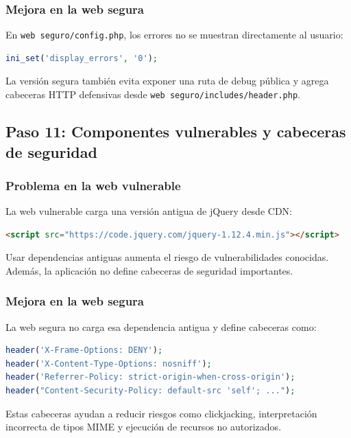 \documentclass[12pt,a4paper]{article}
\begin{document}
\subsubsection*{Mejora en la web segura}

En \texttt{web seguro/config.php}, los errores no se muestran directamente al usuario:

\begin{lstlisting}[language=PHP]
ini_set('display_errors', '0');
\end{lstlisting}

La versión segura también evita exponer una ruta de debug pública y agrega cabeceras HTTP defensivas desde \texttt{web seguro/includes/header.php}.

\subsection{Paso 11: Componentes vulnerables y cabeceras de seguridad}

\subsubsection*{Problema en la web vulnerable}

La web vulnerable carga una versión antigua de jQuery desde CDN:

\begin{lstlisting}[language=HTML]
<script src="https://code.jquery.com/jquery-1.12.4.min.js"></script>
\end{lstlisting}

Usar dependencias antiguas aumenta el riesgo de vulnerabilidades conocidas. Además, la aplicación no define cabeceras de seguridad importantes.

\subsubsection*{Mejora en la web segura}

La web segura no carga esa dependencia antigua y define cabeceras como:

\begin{lstlisting}[language=PHP]
header('X-Frame-Options: DENY');
header('X-Content-Type-Options: nosniff');
header('Referrer-Policy: strict-origin-when-cross-origin');
header("Content-Security-Policy: default-src 'self'; ...");
\end{lstlisting}

Estas cabeceras ayudan a reducir riesgos como clickjacking, interpretación incorrecta de tipos MIME y ejecución de recursos no autorizados.
\end{document}
